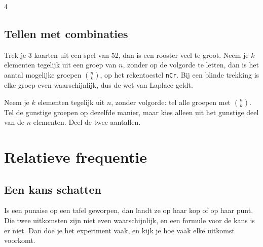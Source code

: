 \begin{alleenvoor}{4}
\subsection{Tellen met combinaties}

Trek je 3 kaarten uit een spel van 52, dan is een rooster veel te groot. Neem je $k$ elementen tegelijk uit een groep van $n$, zonder op de volgorde te letten, dan is het aantal mogelijke groepen $\binom{n}{k}$, op het rekentoestel \texttt{nCr}. Bij een blinde trekking is elke groep even waarschijnlijk, dus de wet van Laplace geldt.


\begin{werkwijze}
Neem je $k$ elementen tegelijk uit $n$, zonder volgorde: tel alle groepen met $\binom{n}{k}$. Tel de gunstige groepen op dezelfde manier, maar kies alleen uit het gunstige deel van de $n$ elementen. Deel de twee aantallen.
\end{werkwijze}

\begin{oefeningen}
\end{oefeningen}
\end{alleenvoor}

\section{Relatieve frequentie}

\subsection{Een kans schatten}

Is een punaise op een tafel geworpen, dan landt ze op haar kop of op haar punt. Die twee uitkomsten zijn niet even waarschijnlijk, en een formule voor de kans is er niet. Dan doe je het experiment vaak, en kijk je hoe vaak elke uitkomst voorkomt.

